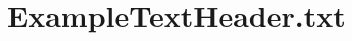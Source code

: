 \hypertarget{_example_text_header_8txt-example}{\section{Example\-Text\-Header.\-txt}
}

\begin{DoxyCodeInclude}
\end{DoxyCodeInclude}
 